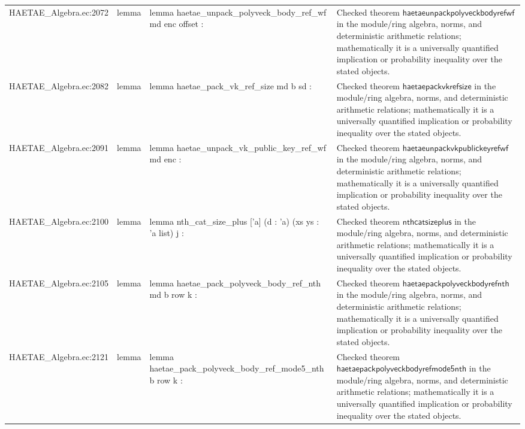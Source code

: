 \documentclass[10pt]{article}
\begin{document}
\begin{longtable}{L{0.11\textwidth}L{0.055\textwidth}L{0.385\textwidth}L{0.41\textwidth}}
HAETAE\_\allowbreak{}Algebra.\allowbreak{}ec:\allowbreak{}2072 & lemma & {\ttfamily\scriptsize lemma haetae\_\allowbreak{}unpack\_\allowbreak{}polyveck\_\allowbreak{}body\_\allowbreak{}ref\_\allowbreak{}wf md enc offset :} & Checked theorem $\mathsf{haetaeunpackpolyveckbodyrefwf}$ in the module/ring algebra, norms, and deterministic arithmetic relations; mathematically it is a universally quantified implication or probability inequality over the stated objects. \\
HAETAE\_\allowbreak{}Algebra.\allowbreak{}ec:\allowbreak{}2082 & lemma & {\ttfamily\scriptsize lemma haetae\_\allowbreak{}pack\_\allowbreak{}vk\_\allowbreak{}ref\_\allowbreak{}size md b sd :} & Checked theorem $\mathsf{haetaepackvkrefsize}$ in the module/ring algebra, norms, and deterministic arithmetic relations; mathematically it is a universally quantified implication or probability inequality over the stated objects. \\
HAETAE\_\allowbreak{}Algebra.\allowbreak{}ec:\allowbreak{}2091 & lemma & {\ttfamily\scriptsize lemma haetae\_\allowbreak{}unpack\_\allowbreak{}vk\_\allowbreak{}public\_\allowbreak{}key\_\allowbreak{}ref\_\allowbreak{}wf md enc :} & Checked theorem $\mathsf{haetaeunpackvkpublickeyrefwf}$ in the module/ring algebra, norms, and deterministic arithmetic relations; mathematically it is a universally quantified implication or probability inequality over the stated objects. \\
HAETAE\_\allowbreak{}Algebra.\allowbreak{}ec:\allowbreak{}2100 & lemma & {\ttfamily\scriptsize lemma nth\_\allowbreak{}cat\_\allowbreak{}size\_\allowbreak{}plus ['a] (d : 'a) (xs ys : 'a list) j :} & Checked theorem $\mathsf{nthcatsizeplus}$ in the module/ring algebra, norms, and deterministic arithmetic relations; mathematically it is a universally quantified implication or probability inequality over the stated objects. \\
HAETAE\_\allowbreak{}Algebra.\allowbreak{}ec:\allowbreak{}2105 & lemma & {\ttfamily\scriptsize lemma haetae\_\allowbreak{}pack\_\allowbreak{}polyveck\_\allowbreak{}body\_\allowbreak{}ref\_\allowbreak{}nth md b row k :} & Checked theorem $\mathsf{haetaepackpolyveckbodyrefnth}$ in the module/ring algebra, norms, and deterministic arithmetic relations; mathematically it is a universally quantified implication or probability inequality over the stated objects. \\
HAETAE\_\allowbreak{}Algebra.\allowbreak{}ec:\allowbreak{}2121 & lemma & {\ttfamily\scriptsize lemma haetae\_\allowbreak{}pack\_\allowbreak{}polyveck\_\allowbreak{}body\_\allowbreak{}ref\_\allowbreak{}mode5\_\allowbreak{}nth b row k :} & Checked theorem $\mathsf{haetaepackpolyveckbodyrefmode5nth}$ in the module/ring algebra, norms, and deterministic arithmetic relations; mathematically it is a universally quantified implication or probability inequality over the stated objects. \\

\end{longtable}
\end{document}
